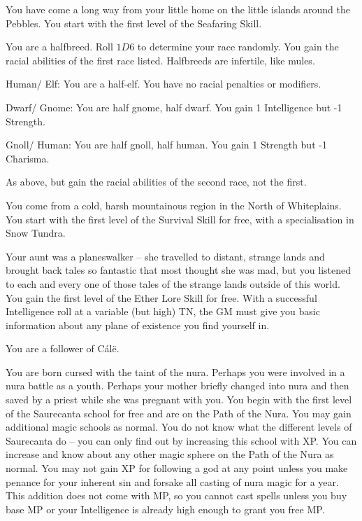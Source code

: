\begin{multicols}{2}
\begin{list}{\addtocounter{list}{1}\textbf{:}}{\raggedleft}
	\item
	You have come a long way from your little home on the little islands around the Pebbles.  You start with the first level of the Seafaring Skill.

	\item
	You are a halfbreed.
	Roll $1D6$ to determine your race randomly.
	You gain the racial abilities of the first race listed.
	Halfbreeds are infertile, like mules.

		\setcounter{enc}{1}
		\begin{list}{\addtocounter{enc}{1}-\addtocounter{enc}{1}:}{}
			\item
			Human/ Elf: You are a half-elf.  You have no racial penalties or modifiers.

			\item
			Dwarf/ Gnome: You are half gnome, half dwarf.  You gain 1 Intelligence but -1 Strength.

			\item
			Gnoll/ Human: You are half gnoll, half human.  You gain 1 Strength but -1 Charisma.
		\end{list}

	\item
	As above, but gain the racial abilities of the second race, not the first.

	\item
	You come from a cold, harsh mountainous region in the North of Whiteplains.
	You start with the first level of the Survival Skill for free, with a specialisation in Snow Tundra.

	\item
	Your aunt was a planeswalker -- she travelled to distant, strange lands and brought back tales so fantastic that most thought she was mad, but you listened to each and every one of those tales of the strange lands outside of this world.
	You gain the first level of the Ether Lore Skill for free.
	With a successful Intelligence roll at a variable (but high) TN, the GM must give you basic information about any plane of existence you find yourself in.

	You are a follower of C\'al\"e.

	\item
	You are born cursed with the taint of the nura.
	Perhaps you were involved in a nura battle as a youth.
	Perhaps your mother briefly changed into nura and then saved by a priest while she was pregnant with you.
	You begin with the first level of the Saurecanta school for free and are on the Path of the Nura.
	You may gain additional magic schools as normal.
	You do not know what the different levels of Saurecanta do -- you can only find out by increasing this school with XP.
	You can increase and know about any other magic sphere on the Path of the Nura as normal.
	You may not gain XP for following a god at any point unless you make penance for your inherent sin and forsake all casting of nura magic for a year.
	This addition does not come with MP, so you cannot cast spells unless you buy base MP or your Intelligence is already high enough to grant you free MP.


\end{list}
\end{multicols}
